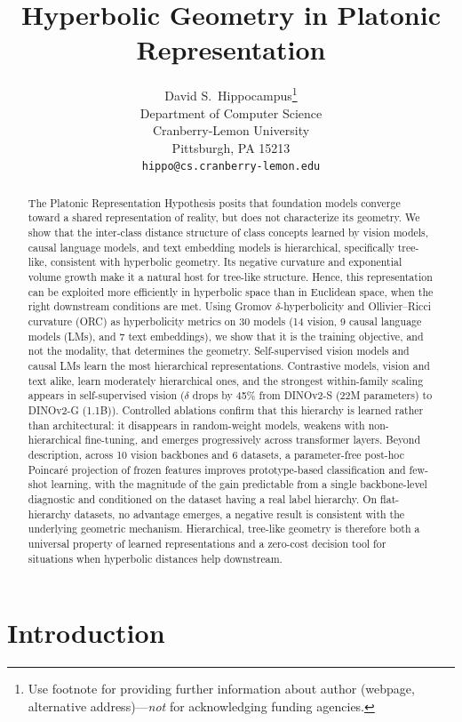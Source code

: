 \documentclass{article}
\title{Hyperbolic Geometry in Platonic Representation}
\author{%
  David S.~Hippocampus\thanks{Use footnote for providing further information
    about author (webpage, alternative address)---\emph{not} for acknowledging
    funding agencies.} \\
  Department of Computer Science\\
  Cranberry-Lemon University\\
  Pittsburgh, PA 15213 \\
  \texttt{hippo@cs.cranberry-lemon.edu} \\
}
\begin{document}
\maketitle


\begin{abstract}
The Platonic Representation Hypothesis posits that foundation models converge toward a shared representation of reality, but does not characterize its geometry. We show that the inter-class distance structure of class concepts learned by vision models, causal language models, and text embedding models is hierarchical, specifically tree-like, consistent with hyperbolic geometry. Its negative curvature and exponential volume growth make it a natural host for tree-like structure. Hence, this representation can be exploited more efficiently in hyperbolic space than in Euclidean space, when the right downstream conditions are met. Using Gromov $\delta$-hyperbolicity and Ollivier--Ricci curvature (ORC) as hyperbolicity metrics on 30 models (14 vision, 9 causal language models (LMs), and 7 text embeddings), we show that it is the training objective, and not the modality, that determines the geometry. Self-supervised vision models and causal LMs learn the most hierarchical representations. Contrastive models, vision and text alike, learn moderately hierarchical ones, and the strongest within-family scaling appears in self-supervised vision ($\delta$ drops by 45\% from DINOv2-S (22M parameters) to DINOv2-G (1.1B)). Controlled ablations confirm that this hierarchy is learned rather than architectural: it disappears in random-weight models, weakens with non-hierarchical fine-tuning, and emerges progressively across transformer layers. Beyond description, across 10 vision backbones and 6 datasets, a parameter-free post-hoc Poincar\'{e} projection of frozen features improves prototype-based classification and few-shot learning, with the magnitude of the gain predictable from a single backbone-level diagnostic and conditioned on the dataset having a real label hierarchy. On flat-hierarchy datasets, no advantage emerges, a negative result is consistent with the underlying geometric mechanism. Hierarchical, tree-like geometry is therefore both a universal property of learned representations and a zero-cost decision tool for situations when hyperbolic distances help downstream.
\end{abstract}


\section{Introduction}
\label{sec:introduction}
\end{document}
